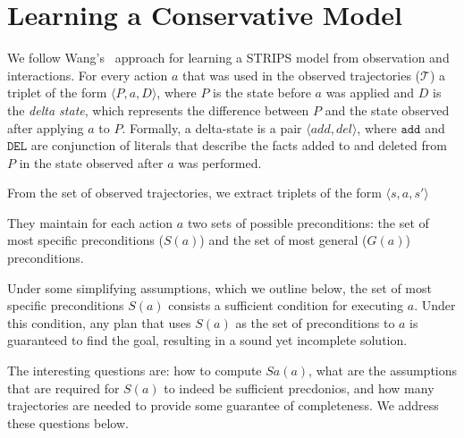 \documentclass[letterpaper]{article}
\begin{document}
\section{Learning a Conservative Model}
We follow Wang's~ approach for learning a STRIPS model from observation and interactions. For every action $a$ that was used in the observed trajectories ($\mathcal{T}$) a triplet of the form 
$\langle P, a, D\rangle$, where $P$ is the state before $a$ was applied and $D$ is the {\em delta state}, which represents the difference between $P$ and the state observed after applying $a$ to $P$. Formally, a delta-state is a pair $\langle add, del \rangle$, where $\mathtt{add}$ and $\mathtt{DEL}$ are conjunction of literals that describe the facts added to and deleted from $P$ in the state observed after $a$ was performed. %



From the set of observed trajectories, we extract triplets of the form $\langle s, a, s'\rangle$

They maintain for each action $a$ two sets of possible preconditions: the set of most specific preconditions ($S(a)$) and the set of most general ($G(a)$) preconditions. 

Under some simplifying assumptions, which we outline below, the set of most specific preconditions $S(a)$ consists a sufficient condition for executing $a$. Under this condition, any plan that uses $S(a)$ as the set of preconditions to $a$ is guaranteed to find the goal, resulting in a sound yet incomplete solution. 

The interesting questions are: how to compute $Sa(a)$, what are the assumptions that are required for $S(a)$ to indeed be sufficient precdonios, and how many trajectories are needed to provide some guarantee of completeness. We address these questions below. 


\end{document}
